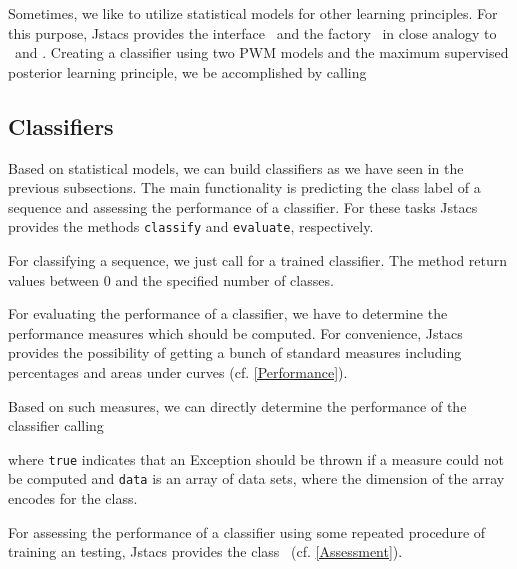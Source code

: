Sometimes, we like to utilize statistical models for other learning principles. For this purpose, Jstacs provides the interface \DiffSM~and the factory \DiffSMFactory~in close analogy to \TrainSM~and \TrainSMFactory. Creating a classifier using two PWM models and the maximum supervised posterior learning principle, we be accomplished by calling
\renewcommand{\codefile}{recipes/CreateMSPClassifier.java}
\setcounter{off}{19}

\subsection{Classifiers}

\renewcommand{\codefile}{recipes/TrainClassifier.java}
Based on statistical models, we can build classifiers as we have seen in the previous subsections. The main functionality is predicting the class label of a sequence and assessing the performance of a classifier. For these tasks Jstacs provides the methods \lstinline+classify+ and \lstinline+evaluate+, respectively.

For classifying a sequence, we just call
\setcounter{off}{37}
for a trained classifier. The method return values between 0 and the specified number of classes. 

For evaluating the performance of a classifier, we have to determine the performance measures which should be computed. For convenience, Jstacs provides the possibility of getting a bunch of standard measures including percentages and areas under curves (cf. \ref{Performance}).
\addtocounter{off}{5}
Based on such measures, we can directly determine the performance of the classifier calling
\addtocounter{off}{1}
where \lstinline+true+ indicates that an Exception should be thrown if a measure could not be computed and \lstinline+data+ is an array of data sets, where the dimension of the array encodes for the class.

For assessing the performance of a classifier using some repeated procedure of training an testing, Jstacs provides the class \ClassifierAssessment~(cf. \ref{Assessment}).

\renewcommand{\codefile}{\defaultcodefile}
\setcounter{off}{1}